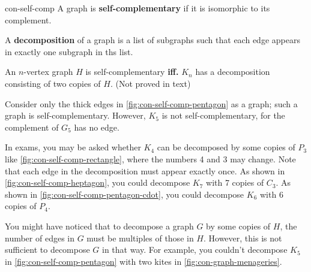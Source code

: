 \documentclass[../src/handouts/main.tex]{subfiles}
\begin{document}
\begin{definition}{}{con-self-comp}
  A graph is \textbf{self-complementary} if it is isomorphic to its complement.

  A \textbf{decomposition} of a graph is a list of subgraphs such that each edge appears in exactly one subgraph in ths list.

  An $n$-vertex graph $H$ is self-complementary \textbf{iff.} $K_n$ has a decomposition consisting of two copies of $H$. (Not proved in text)
\end{definition}

Consider only the thick edges in \cref{fig:con-self-comp-pentagon} as a graph; such a graph is self-complementary. However, $K_5$ is not self-complementary, for the complement of $G_5$ has no edge.

In exams, you may be asked whether $K_4$ can be decomposed by some copies of $P_3$ like \cref{fig:con-self-comp-rectangle}, where the numbers 4 and 3 may change. Note that each edge in the decomposition must appear exactly once. As shown in \cref{fig:con-self-comp-heptagon}, you could decompose $K_7$ with 7 copies of $C_3$. As shown in \cref{fig:con-self-comp-pentagon-cdot}, you could decompose $K_6$ with 6 copies of $P_4$.

You might have noticed that to decompose a graph $G$ by some copies of $H$, the number of edges in $G$ must be multiples of those in $H$. However, this is not sufficient to decompose $G$ in that way. For example, you couldn't decompose $K_5$ in \cref{fig:con-self-comp-pentagon} with two kites in \cref{fig:con-graph-menageries}.
\end{document}
